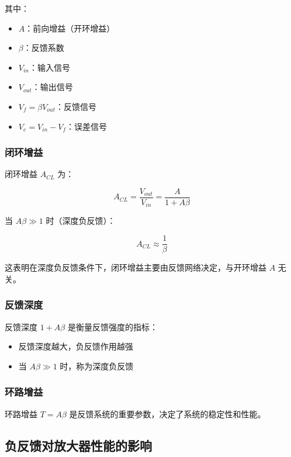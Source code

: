 其中：
\begin{itemize}
  \item $A$：前向增益（开环增益）
  \item $\beta$：反馈系数
  \item $V_{in}$：输入信号
  \item $V_{out}$：输出信号
  \item $V_f = \beta V_{out}$：反馈信号
  \item $V_e = V_{in} - V_f$：误差信号
\end{itemize}

\subsubsection{闭环增益}

闭环增益 $A_{CL}$ 为：

\begin{equation}
A_{CL} = \frac{V_{out}}{V_{in}} = \frac{A}{1 + A\beta} \label{eq:closed-loop-gain}
\end{equation}

当 $A\beta \gg 1$ 时（深度负反馈）：

\begin{equation}
A_{CL} \approx \frac{1}{\beta} \label{eq:closed-loop-gain-approx}
\end{equation}

这表明在深度负反馈条件下，闭环增益主要由反馈网络决定，与开环增益 $A$ 无关。

\subsubsection{反馈深度}

反馈深度 $1 + A\beta$ 是衡量反馈强度的指标：
\begin{itemize}
  \item 反馈深度越大，负反馈作用越强
  \item 当 $A\beta \gg 1$ 时，称为深度负反馈
\end{itemize}

\subsubsection{环路增益}

环路增益 $T = A\beta$ 是反馈系统的重要参数，决定了系统的稳定性和性能。

\subsection{负反馈对放大器性能的影响}

